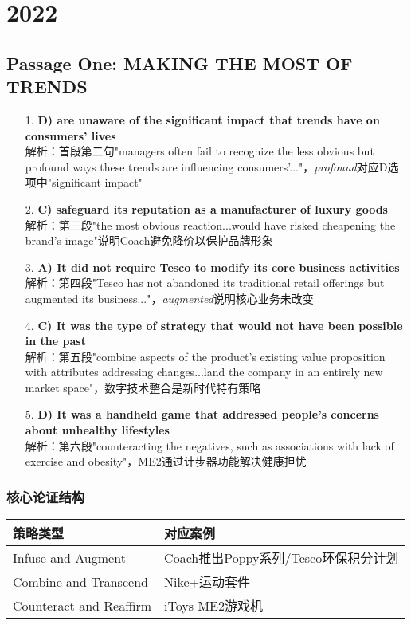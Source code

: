 \documentclass{article}
\begin{document}
\newpage
\section*{2022}

\subsection*{Passage One: MAKING THE MOST OF TRENDS}
\begin{enumerate}
    \item[1.] \textbf{D) are unaware of the significant impact that trends have on consumers' lives} \\ 
    解析：首段第二句"managers often fail to recognize the less obvious but profound ways these trends are influencing consumers'..."，\textit{profound}对应D选项中"significant impact"
    
    \item[2.] \textbf{C) safeguard its reputation as a manufacturer of luxury goods} \\ 
    解析：第三段"the most obvious reaction...would have risked cheapening the brand's image"说明Coach避免降价以保护品牌形象
    
    \item[3.] \textbf{A) It did not require Tesco to modify its core business activities} \\ 
    解析：第四段"Tesco has not abandoned its traditional retail offerings but augmented its business..."，\textit{augmented}说明核心业务未改变
    
    \item[4.] \textbf{C) It was the type of strategy that would not have been possible in the past} \\ 
    解析：第五段"combine aspects of the product's existing value proposition with attributes addressing changes...land the company in an entirely new market space"，数字技术整合是新时代特有策略
    
    \item[5.] \textbf{D) It was a handheld game that addressed people's concerns about unhealthy lifestyles} \\ 
    解析：第六段"counteracting the negatives, such as associations with lack of exercise and obesity"，ME2通过计步器功能解决健康担忧
\end{enumerate}

\subsubsection*{核心论证结构}
\begin{tabular}{|l|l|}
\hline
\textbf{策略类型} & \textbf{对应案例} \\
\hline
Infuse and Augment & Coach推出Poppy系列/Tesco环保积分计划 \\
Combine and Transcend & Nike+运动套件 \\
Counteract and Reaffirm & iToys ME2游戏机 \\
\hline
\end{tabular}
\end{document}

